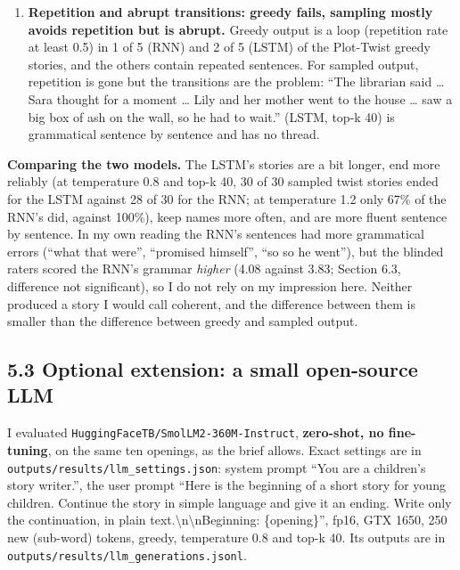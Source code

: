 \documentclass[10pt,a4paper]{article}
\begin{document}
\begin{enumerate}
  40 begins with ``Sara'' and then ``Lily and her mother went to the house'', ``Mia's bed''. The RNN's top-k 40 robot story
  goes through ``Sam'', ``John'', ``Timmy''. Pronouns flip between ``he'' and ``she'' for the same character. Greedy output is the only
  consistent output, and only because it repeats one sentence.
\item
  \textbf{Repetition and abrupt transitions: greedy fails, sampling mostly avoids repetition but is abrupt.} Greedy output is a loop (repetition rate at least 0.5) in 1 of 5 (RNN)
  and 2 of 5 (LSTM) of the Plot-Twist greedy stories, and the others contain repeated sentences. For sampled output,
  repetition is gone but the transitions are the problem: ``The librarian said \ldots{} Sara thought for a moment \ldots{} Lily and her mother went to the
  house \ldots{} saw a big box of ash on the wall, so he had to wait.'' (LSTM, top-k 40) is grammatical sentence by sentence and has no thread.
\end{enumerate}

\textbf{Comparing the two models.} The LSTM's stories are a bit longer, end more reliably (at temperature 0.8 and top-k 40, 30 of 30 sampled twist stories ended
for the LSTM against 28 of 30 for the RNN; at temperature 1.2 only 67\% of the RNN's did, against 100\%), keep names more often, and are more fluent sentence by sentence.
In my own reading the RNN's sentences had more grammatical errors (``what that were'', ``promised himself'', ``so so he went''), but the blinded raters scored the RNN's grammar \emph{higher} (4.08 against 3.83; Section 6.3, difference not significant), so I do not rely on my impression here. Neither produced
a story I would call coherent, and the difference between them is smaller than the difference between greedy and sampled output.

\hypertarget{optional-extension-a-small-open-source-llm}{%
\subsection{5.3 Optional extension: a small open-source LLM}\label{optional-extension-a-small-open-source-llm}}

I evaluated \texttt{HuggingFaceTB/SmolLM2-360M-Instruct}, \textbf{zero-shot, no fine-tuning}, on the same ten openings, as the
brief allows. Exact settings are in \texttt{outputs/results/llm\_settings.json}: system prompt ``You are a children's story writer.'', the user prompt
``Here is the beginning of a short story for young children. Continue the story in simple language and give it an ending.
Write only the continuation, in plain text.\textbackslash{}n\textbackslash{}nBeginning: \{opening\}'', fp16, GTX 1650, 250 new (sub-word) tokens, greedy, temperature 0.8 and
top-k 40. Its outputs are in \texttt{outputs/results/llm\_generations.jsonl}.
\end{document}
